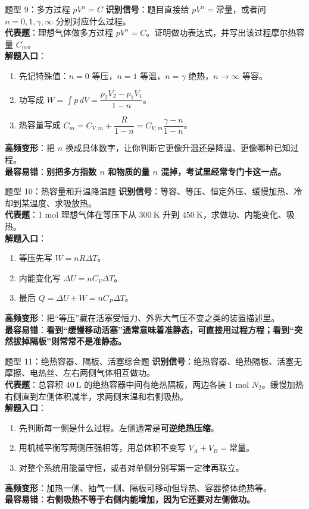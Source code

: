 \documentclass[11pt,a4paper]{ctexart}
\newcommand{\key}[1]{\textcolor{theme}{\textbf{#1}}}
\newcommand{\warn}[1]{\textcolor{red!70!black}{\textbf{#1}}}
\begin{document}
\begin{typebox}{题型 9：多方过程 \(pV^n=C\)}
\textbf{识别信号}：题目直接给 \(pV^n=\text{常量}\)，或者问 \(n=0,1,\gamma,\infty\) 分别对应什么过程。\\
\textbf{代表题}：理想气体做多方过程 \(pV^n=C\)。证明做功表达式，并写出该过程摩尔热容量 \(C_m\)。\\
\textbf{解题入口}：
\begin{enumerate}
  \item 先记特殊值：\(n=0\) 等压，\(n=1\) 等温，\(n=\gamma\) 绝热，\(n\to\infty\) 等容。
  \item 功写成 \(W=\int p\,dV=\dfrac{p_2V_2-p_1V_1}{1-n}\)。
  \item 热容量写成 \(C_m=C_{V,m}+\dfrac{R}{1-n}=C_{V,m}\dfrac{\gamma-n}{1-n}\)。
\end{enumerate}
\textbf{高频变形}：把 \(n\) 换成具体数字，让你判断它更像升温还是降温、更像哪种已知过程。\\
\textbf{最容易错}：\warn{别把多方指数 \(n\) 和物质的量 \(n\) 混掉，考试里经常专门卡这一点。}
\end{typebox}

\begin{typebox}{题型 10：热容量和升温降温题}
\textbf{识别信号}：等容、等压、恒定外压、缓慢加热、冷却到某温度、求吸放热。\\
\textbf{代表题}：1 mol 理想气体在等压下从 \(300\ \mathrm{K}\) 升到 \(450\ \mathrm{K}\)，求做功、内能变化、吸热。\\
\textbf{解题入口}：
\begin{enumerate}
  \item 等压先写 \(W=nR\Delta T\)。
  \item 内能变化写 \(\Delta U=nC_V\Delta T\)。
  \item 最后 \(Q=\Delta U+W=nC_P\Delta T\)。
\end{enumerate}
\textbf{高频变形}：把“等压”藏在活塞受恒力、外界大气压不变之类的装置描述里。\\
\textbf{最容易错}：\warn{看到“缓慢移动活塞”通常意味着准静态，可直接用过程方程；看到“突然拔掉隔板”则常常不是准静态。}
\end{typebox}

\begin{typebox}{题型 11：绝热容器、隔板、活塞综合题}
\textbf{识别信号}：绝热容器、绝热隔板、活塞无摩擦、电热丝、左右两侧气体相互做功。\\
\textbf{代表题}：总容积 \(40\ \mathrm{L}\) 的绝热容器中间有绝热隔板，两边各装 1 mol \(N_2\)。缓慢加热右侧直到左侧体积减半，求两侧末温和右侧吸热。\\
\textbf{解题入口}：
\begin{enumerate}
  \item 先判断每一侧是什么过程。左侧通常是\key{可逆绝热压缩}。
  \item 用机械平衡写两侧压强相等，用总体积不变写 \(V_A+V_B=\text{常量}\)。
  \item 对整个系统用能量守恒，或者对单侧分别写第一定律再联立。
\end{enumerate}
\textbf{高频变形}：加热一侧、抽气一侧、隔板可移动但导热、容器整体绝热等。\\
\textbf{最容易错}：\warn{右侧吸热不等于右侧内能增加，因为它还要对左侧做功。}
\end{typebox}
\end{document}

